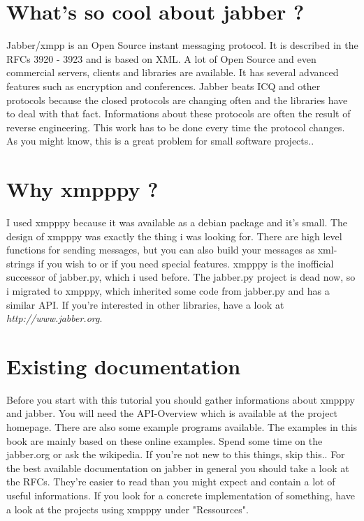 \documentclass[a4paper,10pt]{report}
\begin{document}
\section{What's so cool about jabber ?}
Jabber/xmpp is an Open Source instant messaging protocol. It is described in the RFCs
3920 - 3923 and is based on XML. A lot of Open Source and even commercial servers, clients and libraries are available.
It has several advanced features such as encryption and conferences.
Jabber beats ICQ and other protocols because the closed protocols are changing often and the libraries have to deal
with that fact. Informations about these protocols are often the result of reverse engineering. This work has to be
done every time the protocol changes. As you might know, this is a great problem for small software projects..
\newline
\\

\section{Why xmpppy ?}


I used xmpppy because it was available as a debian package and it's small. The design of xmpppy was exactly the thing i was looking for. There are high level functions for sending messages, but you can also build your messages as xml-strings if you wish to or if you need special features.
\newline
xmpppy is the inofficial successor of jabber.py, which i used before. The jabber.py project is dead now, so i migrated to xmpppy, which inherited some code from jabber.py and has a similar API.
\newline
If you're interested in other libraries, have a look at \textit{http://www.jabber.org}.


\section{Existing documentation}
Before you start with this tutorial you should gather informations about xmpppy and jabber.
You will need the API-Overview which is available at the project homepage. There are also some example programs available. The examples in this book are mainly based on these online examples.
\newline
\newline
Spend some time on the jabber.org or ask the wikipedia. If you're not new to this things, skip this..
\newline
\newline
For the best available documentation on jabber in general you should take a look at the RFCs. They're easier to read than you might expect and contain a lot of useful informations.
\newline
\newline
If you look for a concrete implementation of something, have a look at the projects using xmpppy under "Ressources".
\end{document}
